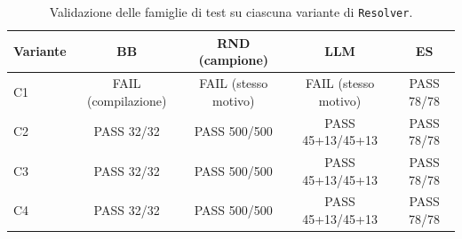 \begin{table}[h]
\centering
\footnotesize
\begin{tabular}{lcccc}
\toprule
\textbf{Variante} & \textbf{BB} & \textbf{RND (campione)} & \textbf{LLM} & \textbf{ES} \\
\midrule
C1 & FAIL (compilazione) & FAIL (stesso motivo) & FAIL (stesso motivo) & PASS 78/78 \\
C2 & PASS 32/32 & PASS 500/500 & PASS 45+13/45+13 & PASS 78/78 \\
C3 & PASS 32/32 & PASS 500/500 & PASS 45+13/45+13 & PASS 78/78 \\
C4 & PASS 32/32 & PASS 500/500 & PASS 45+13/45+13 & PASS 78/78 \\
\bottomrule
\end{tabular}
\caption{Validazione delle famiglie di test su ciascuna variante di \texttt{Resolver}.}
\label{tab:resolver-refactor-passfail}
\end{table}

